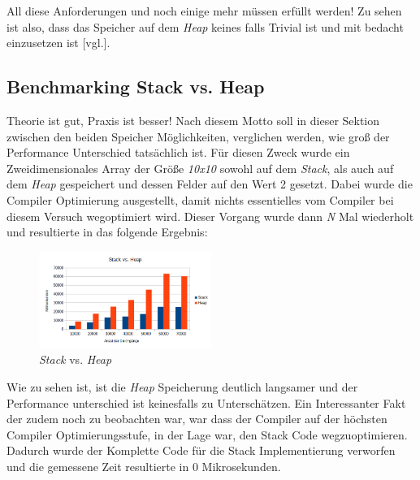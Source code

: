 All diese Anforderungen und noch einige mehr müssen erfüllt werden! Zu sehen ist also, dass das
Speicher auf dem \emph{Heap} keines falls Trivial ist und mit bedacht einzusetzen ist
\cite{HandsOn}[vgl.].

\subsection{Benchmarking Stack vs. Heap}
Theorie ist gut, Praxis ist besser! Nach diesem Motto soll in dieser Sektion zwischen den beiden
Speicher Möglichkeiten, verglichen werden, wie groß der Performance Unterschied tatsächlich ist.
Für diesen Zweck wurde ein Zweidimensionales Array der Größe \emph{10x10} sowohl auf dem
\emph{Stack}, als auch auf dem \emph{Heap} gespeichert und dessen Felder auf den Wert 2 gesetzt.
Dabei wurde die Compiler Optimierung ausgestellt, damit nichts essentielles vom Compiler bei
diesem Versuch wegoptimiert wird. Dieser Vorgang wurde dann \emph{N} Mal wiederholt und
resultierte in das folgende Ergebnis:

\begin{figure}[h]
    \centering
    \includegraphics[width=0.5\textwidth]{bilder/StackvsHeap}
    \caption[StackvsHeap]{\emph{Stack} vs. \emph{Heap}}
    \label{img:StackvsHeap}
\end{figure}

Wie zu sehen ist, ist die \emph{Heap} Speicherung deutlich langsamer und der Performance
unterschied ist keinesfalls zu Unterschätzen.
\newline
\newline
Ein Interessanter Fakt der zudem noch zu beobachten war, war dass der Compiler auf der höchsten
Compiler Optimierungsstufe, in der Lage war, den Stack Code wegzuoptimieren. Dadurch wurde der
Komplette Code für die Stack Implementierung verworfen und die gemessene Zeit resultierte in 0
Mikrosekunden.

